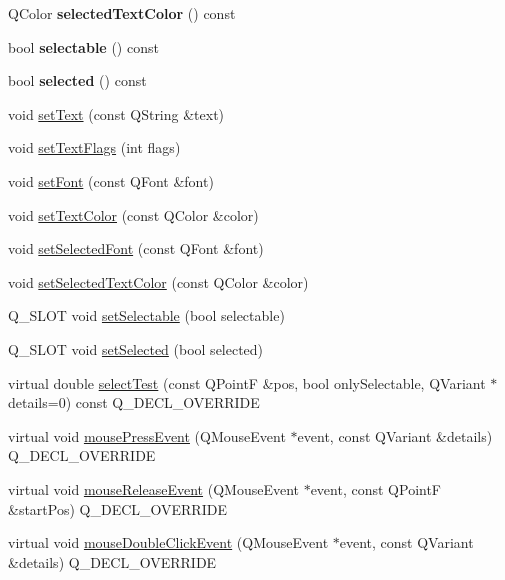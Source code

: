 \begin{DoxyCompactItemize}
\item 
Q\+Color {\bfseries selected\+Text\+Color} () const \hypertarget{classQCPTextElement_a419b72712eda4242cd169926440ab6a9}{}\label{classQCPTextElement_a419b72712eda4242cd169926440ab6a9}

\item 
bool {\bfseries selectable} () const \hypertarget{classQCPTextElement_ad6f36a709b85638a0e2c005efa4b1049}{}\label{classQCPTextElement_ad6f36a709b85638a0e2c005efa4b1049}

\item 
bool {\bfseries selected} () const \hypertarget{classQCPTextElement_a81f68f4628a7e3c4bd22dbcce09740c5}{}\label{classQCPTextElement_a81f68f4628a7e3c4bd22dbcce09740c5}

\item 
void \hyperlink{classQCPTextElement_ac44b81e69e719b879eb2feecb33557e2}{set\+Text} (const Q\+String \&text)
\item 
void \hyperlink{classQCPTextElement_ab908f437f552020888a3ad8cf8242605}{set\+Text\+Flags} (int flags)
\item 
void \hyperlink{classQCPTextElement_a09b3241769528fa87cb4bf35c97defad}{set\+Font} (const Q\+Font \&font)
\item 
void \hyperlink{classQCPTextElement_a4f3b8361c3ffb3f84346954929ce93ba}{set\+Text\+Color} (const Q\+Color \&color)
\item 
void \hyperlink{classQCPTextElement_a0a2397a3c4ede519e16ab3e991904065}{set\+Selected\+Font} (const Q\+Font \&font)
\item 
void \hyperlink{classQCPTextElement_abaec200cae70a0eade53583defc0476d}{set\+Selected\+Text\+Color} (const Q\+Color \&color)
\item 
Q\+\_\+\+S\+L\+OT void \hyperlink{classQCPTextElement_a3c5f9b1897a036b16495ed3fb8371c55}{set\+Selectable} (bool selectable)
\item 
Q\+\_\+\+S\+L\+OT void \hyperlink{classQCPTextElement_aba5521f9fb22a5f3d2f09ab37d4a1751}{set\+Selected} (bool selected)
\item 
virtual double \hyperlink{classQCPTextElement_a1e721bc2994a127ef5a8f0a514a5dbac}{select\+Test} (const Q\+PointF \&pos, bool only\+Selectable, Q\+Variant $\ast$details=0) const Q\+\_\+\+D\+E\+C\+L\+\_\+\+O\+V\+E\+R\+R\+I\+DE
\item 
virtual void \hyperlink{classQCPTextElement_ad7b2c98355e3d2f912574b74fcee0574}{mouse\+Press\+Event} (Q\+Mouse\+Event $\ast$event, const Q\+Variant \&details) Q\+\_\+\+D\+E\+C\+L\+\_\+\+O\+V\+E\+R\+R\+I\+DE
\item 
virtual void \hyperlink{classQCPTextElement_acfcbaf9b1da18745e72726aafb39c855}{mouse\+Release\+Event} (Q\+Mouse\+Event $\ast$event, const Q\+PointF \&start\+Pos) Q\+\_\+\+D\+E\+C\+L\+\_\+\+O\+V\+E\+R\+R\+I\+DE
\item 
virtual void \hyperlink{classQCPTextElement_a2272ff775ab385f612e9fd39773de7c0}{mouse\+Double\+Click\+Event} (Q\+Mouse\+Event $\ast$event, const Q\+Variant \&details) Q\+\_\+\+D\+E\+C\+L\+\_\+\+O\+V\+E\+R\+R\+I\+DE
\end{DoxyCompactItemize}
